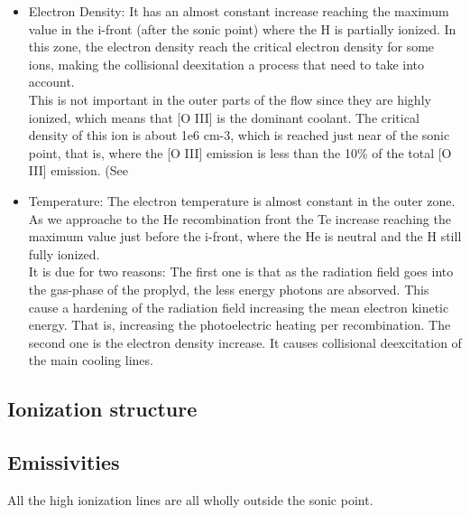 \documentclass{article}
\begin{document}
\begin{itemize}
  \item{Electron Density: It has an almost constant increase reaching
      the maximum value in the i-front (after the sonic point) where the H is partially
      ionized. In this zone, the electron density reach the critical
      electron density for some ions, making the collisional
      deexitation a process that need to take into account.\\
    This is not important in the outer parts of the flow since they
    are highly ionized, which means that [O III] is the dominant
    coolant. The critical density of this ion is about 1e6 cm-3, which
  is reached just near of the sonic point, that is, where the [O III]
  emission is less than the 10\% of the total [O III] emission. (See
}
  \item{Temperature: The electron temperature is almost constant in
      the outer zone. As we approache to the He recombination front
      the Te increase reaching the maximum value just before the
      i-front, where the He is neutral and the H still fully ionized. \\
    It is due for two reasons: The first one is that as the radiation
    field goes into the gas-phase of the proplyd, the less energy
    photons are absorved. This cause a hardening of the radiation
    field increasing the mean electron kinetic energy. That is,
    increasing the photoelectric heating per recombination. The second
  one is the electron density increase. It causes collisional
  deexcitation of the main cooling lines.}
\end{itemize}

\subsection{Ionization structure}
\label{sec:ionization}



\subsection{Emissivities}
\label{sec:emi}

All the high ionization lines are all wholly outside the sonic point.
\end{document}
